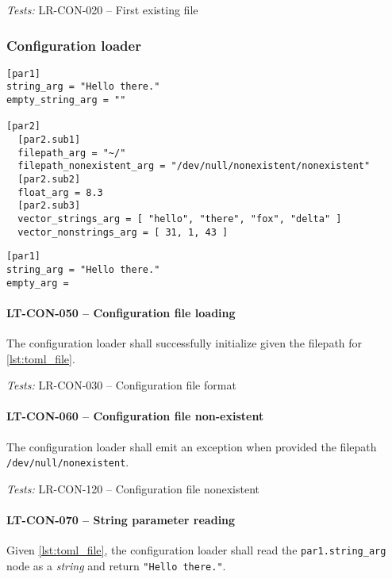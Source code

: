 \textit{Tests: } LR-CON-020 -- First existing file

\subsubsection{Configuration loader}
\begin{minipage}{\linewidth}
  \begin{lstlisting}[caption={TOML test configuration file.},
                     label={lst:toml_file}]
[par1]
string_arg = "Hello there."
empty_string_arg = ""

[par2]
  [par2.sub1]
  filepath_arg = "~/"
  filepath_nonexistent_arg = "/dev/null/nonexistent/nonexistent"
  [par2.sub2]
  float_arg = 8.3
  [par2.sub3]
  vector_strings_arg = [ "hello", "there", "fox", "delta" ]
  vector_nonstrings_arg = [ 31, 1, 43 ]
\end{lstlisting} \end{minipage}

\begin{minipage}{\linewidth}
  \begin{lstlisting}[caption={TOML test configuration file.},
                     label={lst:toml_file_empty}]
[par1]
string_arg = "Hello there."
empty_arg = 
\end{lstlisting} \end{minipage}

\paragraph{LT-CON-050 -- Configuration file loading}
The configuration loader shall successfully initialize given the filepath
for \cref{lst:toml_file}.

\textit{Tests: } LR-CON-030 -- Configuration file format

\paragraph{LT-CON-060 -- Configuration file non-existent}
The configuration loader shall emit an exception when provided the
filepath \lstinline{/dev/null/nonexistent}.

\textit{Tests: } LR-CON-120 -- Configuration file nonexistent

\paragraph{LT-CON-070 -- String parameter reading}
Given \cref{lst:toml_file}, the configuration loader shall read the
\lstinline{par1.string_arg} node as a \emph{string} and return
\lstinline{"Hello there."}.


